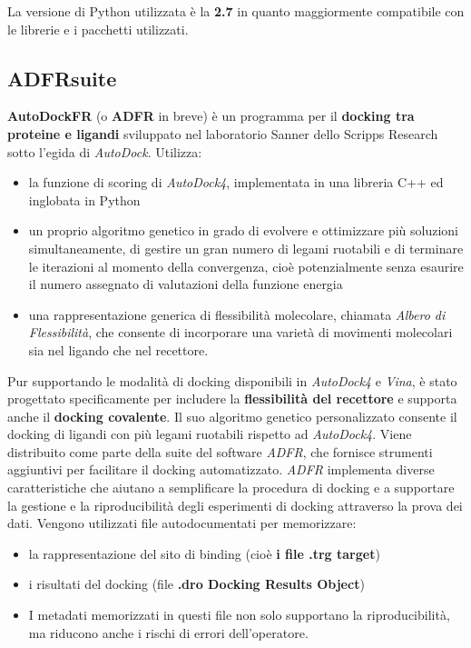 La versione di Python utilizzata è la \textbf{2.7} in quanto maggiormente compatibile con le librerie e i pacchetti utilizzati.

\subsection{ADFRsuite}\label{sec:2.1.2}
\textbf{AutoDockFR} (o \textbf{ADFR} in breve) è un programma per il \textbf{docking tra proteine e ligandi} sviluppato nel laboratorio Sanner dello Scripps Research sotto l'egida di \textit{AutoDock}.\newline
Utilizza:

\begin{itemize}
    \item la funzione di scoring di \textit{AutoDock4}, implementata in una libreria C++ ed inglobata in Python
    \item un proprio algoritmo genetico in grado di evolvere e ottimizzare più soluzioni simultaneamente, di gestire un gran numero di legami ruotabili e di terminare le iterazioni al momento della convergenza, cioè potenzialmente senza esaurire il numero assegnato di valutazioni della funzione energia
    \item una rappresentazione generica di flessibilità molecolare, chiamata \textit{Albero di Flessibilità}, che consente di incorporare una varietà di movimenti molecolari sia nel ligando che nel recettore.
\end{itemize}

Pur supportando le modalità di docking disponibili in \textit{AutoDock4} e \textit{Vina}, è stato progettato specificamente per includere la \textbf{flessibilità del recettore} e supporta anche il \textbf{docking covalente}. Il suo algoritmo genetico personalizzato consente il docking di ligandi con più legami ruotabili rispetto ad \textit{AutoDock4}.\newline
Viene distribuito come parte della suite del software \textit{ADFR}, che fornisce strumenti aggiuntivi per facilitare il docking automatizzato.\newline
\textit{ADFR} implementa diverse caratteristiche che aiutano a semplificare la procedura di docking e a supportare la gestione e la riproducibilità degli esperimenti di docking attraverso la prova dei dati. Vengono utilizzati file autodocumentati per memorizzare: 

\begin{itemize}
    \item la rappresentazione del sito di binding (cioè \textbf{i file .trg target})
    \item i risultati del docking (file \textbf{.dro Docking Results Object})
    \item I metadati memorizzati in questi file non solo supportano la riproducibilità, ma riducono anche i rischi di errori dell'operatore.
\end{itemize}

